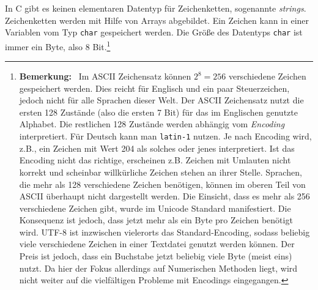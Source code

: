 In C gibt es keinen elementaren Datentyp für Zeichenketten, sogenannte \emph{strings}.
Zeichenketten werden mit Hilfe von Arrays abgebildet.
Ein Zeichen kann in einer Variablen vom Typ \verb|char| gespeichert werden.
Die Größe des Datentyps \texttt{char} ist immer ein Byte, also 8 Bit.\footnote{\textbf{Bemerkung:}~ Im ASCII Zeichensatz können $2^8= 256$ verschiedene Zeichen gespeichert werden.
Dies reicht für Englisch und ein paar Steuerzeichen, jedoch nicht für alle Sprachen dieser Welt.
Der ASCII Zeichensatz nutzt die ersten 128 Zustände (also die ersten 7 Bit) für das im Englischen genutzte Alphabet.
Die restlichen 128 Zustände werden abhängig vom  \emph{Encoding} interpretiert.
Für Deutsch kann man \texttt{latin-1} nutzen.
Je nach Encoding wird, z.B., ein Zeichen mit Wert 204 als solches oder jenes interpretiert.
Ist das Encoding nicht das richtige, erscheinen z.B. Zeichen mit Umlauten
nicht korrekt und scheinbar willkürliche Zeichen stehen an ihrer Stelle.
Sprachen, die mehr als 128 verschiedene Zeichen benötigen, können im oberen
Teil von ASCII überhaupt nicht dargestellt werden. Die Einsicht, dass es
mehr als 256 verschiedene Zeichen gibt, wurde im Unicode Standard
manifestiert. Die Konsequenz ist jedoch, dass jetzt mehr als ein Byte pro
Zeichen benötigt wird. UTF-8 ist inzwischen vielerorts das Standard-Encoding, sodass
beliebig viele verschiedene Zeichen in einer Textdatei genutzt werden
können. Der Preis ist jedoch, dass ein Buchstabe jetzt beliebig viele Byte
(meist eins) nutzt. Da hier der Fokus allerdings auf Numerischen Methoden
liegt, wird nicht weiter auf die vielfältigen Probleme mit Encodings
eingegangen.}

